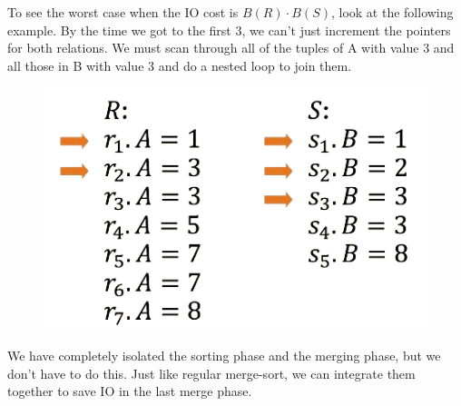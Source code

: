 \documentclass{article}
\begin{document}
      \begin{example}
        To see the worst case when the IO cost is $B(R) \cdot B(S)$, look at the following example. By the time we got to the first $3$, we can't just increment the pointers for both relations. We must scan through all of the tuples of A with value 3 and all those in B with value 3 and do a nested loop to join them. 
        
        \begin{figure}[H]
          \centering 
          \includegraphics[scale=0.4]{img/nested_loop.png}
          \caption{} 
          \label{fig:nested_loop}
        \end{figure}
      \end{example}

      We have completely isolated the sorting phase and the merging phase, but we don't have to do this. Just like regular merge-sort, we can integrate them together to save IO in the last merge phase. 
\end{document}
